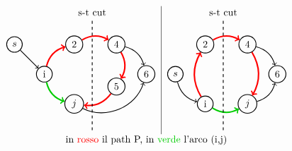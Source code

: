 \documentclass[a4paper, 11pt]{report}
\begin{document}
\[\begin{tabular}{c|c}
    \begin{tikzpicture}[node distance={15mm}, thick , main/.style = {draw, circle}] 
    
    \node[main] (1) {i};
    \node[main] (0) [above left of = 1] {$s$};
    \node[main] (2) [above right of=1] {$2$};
    \node[main] (3) [below right of=1] {$j$};
    \node[main] (4) [right of=2] {$4$};
    \node[main] (6) [below right of=4] {$6$};
    \node[main] (5) [below of=4] {$5$};
    \draw[->] (0) to (1);
    \draw[->,line width=1.5 pt] (1)[red, bend left] to (2);
    \draw[->,line width=1.5 pt] (1)[green!80!black, bend right] to (3);
    \draw[->,line width=1.5 pt] (2)[red, bend left] to (4);
    \draw[->,line width=1.5 pt] (4)[red,bend left] to (5);
    \draw[->] (4)[bend left] to (6);
    \draw[->] (3)[bend right = 50] to (6);
    \draw[->,line width=1.5 pt] (5)[red,bend left] to (3);

    \draw[dashed] (1.7,-2) -- (1.7,2);
    \node at (1.7,2.2) {s-t\ cut};

\end{tikzpicture}& 
\begin{tikzpicture}[node distance={15mm}, thick , main/.style = {draw, circle}] 
    
    
    \node[main] (0) {$s$};
    \node[main] (1) [below right of = 0] {i};
    \node[main] (2) [above right of=0] {$2$};
    \node[main] (4) [right of=2] {$4$};
    \node[main] (6) [below right of=4] {$6$};
    \node[main] (3) [below left of=6] {$j$};
    \draw[->] (0)[bend right] to (1);
    \draw[->,line width=1.5 pt] (1)[red, bend left] to (2);
    \draw[->,line width=1.5 pt] (1)[green!80!black, bend right] to (3);
    \draw[->,line width=1.5 pt] (2)[red, bend left] to (4);
    \draw[->,line width=1.5 pt] (4)[red, bend left] to (3);
    
    \draw[->] (4)[bend left] to (6);
    \draw[->] (3)[bend right] to (6);


    \draw[dashed] (1.7,-2) -- (1.7,2);
    \node at (1.7,2.2) {s-t\ cut};

\end{tikzpicture}\\
    \multicolumn{2}{c}{in {\color{red}{rosso}} il path P, in {\color{green!80!black}{verde}} l'arco (i,j)}
 


\end{tabular}\]
\end{document}
